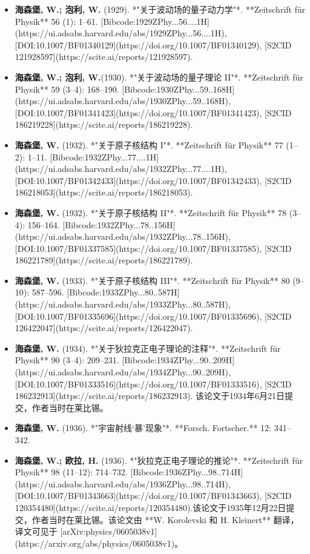 \begin{itemize}
\item \textbf{海森堡, W.; 泡利, W.} (1929). *"关于波动场的量子动力学"*. **Zeitschrift für Physik** 56 (1): 1–61. [Bibcode:1929ZPhy...56....1H](https://ui.adsabs.harvard.edu/abs/1929ZPhy...56....1H), [DOI:10.1007/BF01340129](https://doi.org/10.1007/BF01340129), [S2CID 121928597](https://scite.ai/reports/121928597).  
\item \textbf{海森堡, W.; 泡利, W.}(1930). *"关于波动场的量子理论 II"*. **Zeitschrift für Physik** 59 (3–4): 168–190. [Bibcode:1930ZPhy...59..168H](https://ui.adsabs.harvard.edu/abs/1930ZPhy...59..168H), [DOI:10.1007/BF01341423](https://doi.org/10.1007/BF01341423), [S2CID 186219228](https://scite.ai/reports/186219228).  
\item \textbf{海森堡, W.} (1932). *"关于原子核结构 I"*. **Zeitschrift für Physik** 77 (1–2): 1–11. [Bibcode:1932ZPhy...77....1H](https://ui.adsabs.harvard.edu/abs/1932ZPhy...77....1H), [DOI:10.1007/BF01342433](https://doi.org/10.1007/BF01342433), [S2CID 186218053](https://scite.ai/reports/186218053).  
\item \textbf{海森堡, W.} (1932). *"关于原子核结构 II"*. **Zeitschrift für Physik** 78 (3–4): 156–164. [Bibcode:1932ZPhy...78..156H](https://ui.adsabs.harvard.edu/abs/1932ZPhy...78..156H), [DOI:10.1007/BF01337585](https://doi.org/10.1007/BF01337585), [S2CID 186221789](https://scite.ai/reports/186221789).  
\item \textbf{海森堡, W.} (1933). *"关于原子核结构 III"*. **Zeitschrift für Physik** 80 (9–10): 587–596. [Bibcode:1933ZPhy...80..587H](https://ui.adsabs.harvard.edu/abs/1933ZPhy...80..587H), [DOI:10.1007/BF01335696](https://doi.org/10.1007/BF01335696), [S2CID 126422047](https://scite.ai/reports/126422047).
\item \textbf{海森堡, W.} (1934). *"关于狄拉克正电子理论的注释"*. **Zeitschrift für Physik** 90 (3–4): 209–231. [Bibcode:1934ZPhy...90..209H](https://ui.adsabs.harvard.edu/abs/1934ZPhy...90..209H), [DOI:10.1007/BF01333516](https://doi.org/10.1007/BF01333516), [S2CID 186232913](https://scite.ai/reports/186232913). 该论文于1934年6月21日提交，作者当时在莱比锡。  
\item \textbf{海森堡, W.} (1936). *"宇宙射线‘暴’现象"*. **Forsch. Fortscher.** 12: 341–342.  
\item \textbf{海森堡, W.; 欧拉, H.} (1936). *"狄拉克正电子理论的推论"*. **Zeitschrift für Physik** 98 (11–12): 714–732. [Bibcode:1936ZPhy...98..714H](https://ui.adsabs.harvard.edu/abs/1936ZPhy...98..714H), [DOI:10.1007/BF01343663](https://doi.org/10.1007/BF01343663), [S2CID 120354480](https://scite.ai/reports/120354480).该论文于1935年12月22日提交，作者当时在莱比锡。该论文由 **W. Korolevski 和 H. Kleinert** 翻译，译文可见于 [arXiv:physics/0605038v1](https://arxiv.org/abs/physics/0605038v1)。  

\end{itemize}
